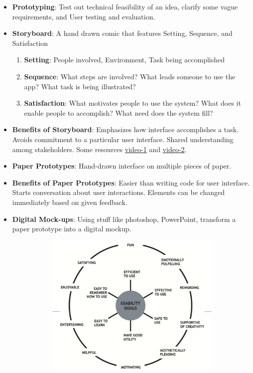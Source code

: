 \documentclass[a4paper]{article}
\begin{document}
\begin{itemize}
    \item \textbf{Prototyping}: Test out technical feasibility of an idea, clarify some vague requirements, and User testing and evaluation.
    \item \textbf{Storyboard}: A hand drawn comic that features Setting, Sequence, and Satisfaction
    \begin{enumerate}
        \item \textbf{Setting}: People involved, Environment, Task being accomplished
        \item \textbf{Sequence}: What steps are involved? What leads someone to use the app? What task is being illustrated?
        \item \textbf{Satisfaction}: What motivates people to use the system? What does it enable people to accomplish? What need does the system fill?
    \end{enumerate}
    \item \textbf{Benefits of Storyboard}: Emphasizes how interface accomplishes a task. Avoids commitment to a particular user interface. Shared understanding among stakeholders. Some resources \href{https://www.youtube.com/watch?v=JMjozqJS44M}{video-1} and \href{https://www.youtube.com/watch?v=6dre0P4tRTc}{video-2}.
    \item \textbf{Paper Prototypes}: Hand-drawn interface on multiple pieces of paper. 
    \item \textbf{Benefits of Paper Prototypes}: Easier than writing code for user interface. Starts conversation about user interactions. Elements can be changed immediately based on given feedback.
    \item \textbf{Digital Mock-ups}: Using stuff like photoshop, PowerPoint, transform a paper prototype into a digital mockup.
    \begin{figure}[H]
        \centering
        \begin{subfigure}[b]{0.45\textwidth}
            \centering
            \includegraphics[width=\textwidth]{Degree//static/SE_User_Goals.png}

\end{subfigure}
\end{figure}
\end{itemize}
\end{document}
